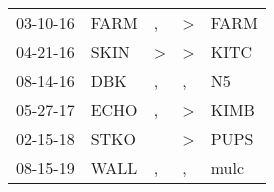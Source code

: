 \begin{supertabular}{p{0.07\textwidth}p{0.06\textwidth}p{0.02\textwidth}p{0.02\textwidth}p{0.06\textwidth}}
          03-10-16\textsuperscript{} &           FARM\textsuperscript{} &                , &  \textgreater &           FARM\textsuperscript{} \\
          04-21-16\textsuperscript{} &           SKIN\textsuperscript{} &     \textgreater &  \textgreater &           KITC\textsuperscript{} \\
          08-14-16\textsuperscript{} &            DBK\textsuperscript{} &                , &             , &             N5\textsuperscript{} \\
          05-27-17\textsuperscript{} &           ECHO\textsuperscript{} &                , &  \textgreater &           KIMB\textsuperscript{} \\
          02-15-18\textsuperscript{} &           STKO\textsuperscript{} &                  &  \textgreater &           PUPS\textsuperscript{} \\
          08-15-19\textsuperscript{} &           WALL\textsuperscript{} &                , &             , &           mulc\textsuperscript{} \\
\end{supertabular}
